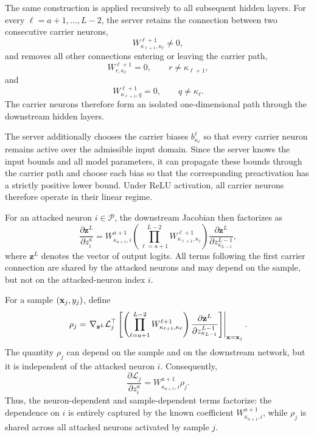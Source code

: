 The same construction is applied recursively to all subsequent hidden
layers. For every $\ell=a+1,\ldots,L-2$, the server retains the connection
between two consecutive carrier neurons,
\[
    W^{\ell+1}_{\kappa_{\ell+1},\kappa_\ell}\neq 0,
\]
and removes all other connections entering or leaving the carrier path,
\[
    W^{\ell+1}_{r,\kappa_\ell}=0,
    \qquad r\neq\kappa_{\ell+1},
\]
and
\[
    W^{\ell+1}_{\kappa_{\ell+1},q}=0,
    \qquad q\neq\kappa_\ell.
\]
The carrier neurons therefore form an isolated one-dimensional path
through the downstream hidden layers.

The server additionally chooses the carrier biases
$b^\ell_{\kappa_\ell}$ so that every carrier neuron remains active over
the admissible input domain. Since the server knows the input bounds and
all model parameters, it can propagate these bounds through the carrier
path and choose each bias so that the corresponding preactivation has a
strictly positive lower bound. Under ReLU activation, all carrier neurons
therefore operate in their linear regime.

For an attacked neuron $i\in\mathcal P$, the downstream Jacobian then
factorizes as
\[
\frac{\partial \mathbf z^L}{\partial z_i^a}
=
W^{a+1}_{\kappa_{a+1},i}
\left(
\prod_{\ell=a+1}^{L-2}
W^{\ell+1}_{\kappa_{\ell+1},\kappa_\ell}
\right)
\frac{\partial \mathbf z^L}
     {\partial z^{L-1}_{\kappa_{L-1}}},
\]
where $\mathbf z^L$ denotes the vector of output logits. All terms
following the first carrier connection are shared by the attacked neurons
and may depend on the sample, but not on the attacked-neuron index $i$.

For a sample $({\mathbf{x}}_j,y_j)$, define
\[
\rho_j
=
\left.
\nabla_{\mathbf z^L}\mathcal L_j^\top
\left[
\left(
\prod_{\ell=a+1}^{L-2}
W^{\ell+1}_{\kappa_{\ell+1},\kappa_\ell}
\right)
\frac{\partial \mathbf z^L}
     {\partial z^{L-1}_{\kappa_{L-1}}}
\right]
\right|_{{\mathbf{x}}={\mathbf{x}}_j}.
\]
The quantity $\rho_j$ can depend on the sample and on the downstream
network, but it is independent of the attacked neuron $i$. Consequently,
\[
\frac{\partial\mathcal L_j}{\partial z_i^a}
=
W^{a+1}_{\kappa_{a+1},i}\rho_j.
\]
Thus, the neuron-dependent and sample-dependent terms factorize: the
dependence on $i$ is entirely captured by the known coefficient
$W^{a+1}_{\kappa_{a+1},i}$, while $\rho_j$ is shared across all attacked
neurons activated by sample $j$.

